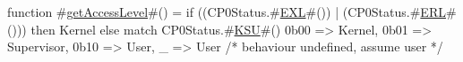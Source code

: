 function #\hyperref[sailMIPSzgetAccessLevel]{getAccessLevel}#() =
  if ((CP0Status.#\hyperref[sailMIPSzEXL]{EXL}#()) | (CP0Status.#\hyperref[sailMIPSzERL]{ERL}#())) then
    Kernel
  else match CP0Status.#\hyperref[sailMIPSzKSU]{KSU}#()
    {
      0b00  => Kernel,
      0b01  => Supervisor,
      0b10  => User,
      _     => User /* behaviour undefined, assume user */
    }
